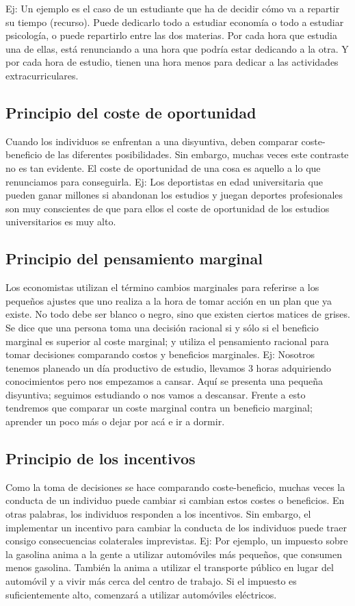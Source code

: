 \documentclass{report}
\begin{document}
Ej: Un ejemplo es el caso de un estudiante que ha de decidir cómo va a repartir su tiempo (recurso). Puede dedicarlo todo a estudiar economía o todo a estudiar psicología, o puede repartirlo entre las dos materias.  Por cada hora que estudia una de ellas, está renunciando a una hora que podría estar dedicando a la otra. Y por cada hora de estudio, tienen una hora menos para dedicar a las actividades extracurriculares.

\subsection{Principio del coste de oportunidad}
Cuando los individuos se enfrentan a una disyuntiva, deben comparar coste-beneficio de las diferentes posibilidades. Sin embargo, muchas veces este contraste no es tan evidente. El coste de oportunidad de una cosa es aquello a lo que renunciamos para conseguirla.
Ej: Los deportistas en edad universitaria que pueden ganar millones si abandonan los estudios y juegan deportes profesionales son muy conscientes de que para ellos el coste de oportunidad de los estudios universitarios es muy alto.

\subsection{Principio del pensamiento marginal}
Los economistas utilizan el término cambios marginales para referirse a los pequeños ajustes que uno realiza a la hora de tomar acción en un plan que ya existe. No todo debe ser blanco o negro, sino que existen ciertos matices de grises.
Se dice que una persona toma una decisión racional si y sólo si el beneficio marginal es superior al coste marginal; y utiliza el pensamiento racional para tomar decisiones comparando costos y beneficios marginales.
Ej: Nosotros tenemos planeado un día productivo de estudio, llevamos 3 horas adquiriendo conocimientos pero nos empezamos a cansar. Aquí se presenta una pequeña disyuntiva; seguimos estudiando o nos vamos a descansar. Frente a esto tendremos que comparar un coste marginal contra un beneficio marginal; aprender un poco más o dejar por acá e ir a dormir.

\subsection{Principio de los incentivos}
Como la toma de decisiones se hace comparando coste-beneficio, muchas veces la conducta de un individuo puede cambiar si cambian estos costes o beneficios. En otras palabras, los individuos responden a los incentivos. Sin embargo, el implementar un incentivo para cambiar la conducta de los individuos puede traer consigo consecuencias colaterales imprevistas.
Ej: Por ejemplo, un impuesto sobre la gasolina anima a la gente a utilizar automóviles más pequeños, que consumen menos gasolina. También la anima a utilizar el transporte público en lugar del automóvil y a vivir más cerca del centro de trabajo. Si el impuesto es suficientemente alto, comenzará a utilizar automóviles eléctricos.
\end{document}
